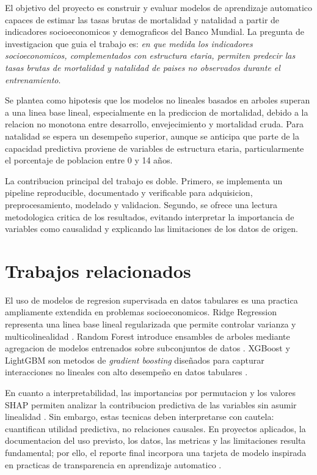 \documentclass[conference]{IEEEtran}
\begin{document}
El objetivo del proyecto es construir y evaluar modelos de aprendizaje automatico capaces de estimar las tasas brutas de mortalidad y natalidad a partir de indicadores socioeconomicos y demograficos del Banco Mundial. La pregunta de investigacion que guia el trabajo es: \textit{en que medida los indicadores socioeconomicos, complementados con estructura etaria, permiten predecir las tasas brutas de mortalidad y natalidad de paises no observados durante el entrenamiento}.

Se plantea como hipotesis que los modelos no lineales basados en arboles superan a una linea base lineal, especialmente en la prediccion de mortalidad, debido a la relacion no monotona entre desarrollo, envejecimiento y mortalidad cruda. Para natalidad se espera un desempeño superior, aunque se anticipa que parte de la capacidad predictiva proviene de variables de estructura etaria, particularmente el porcentaje de poblacion entre 0 y 14 años.

La contribucion principal del trabajo es doble. Primero, se implementa un pipeline reproducible, documentado y verificable para adquisicion, preprocesamiento, modelado y validacion. Segundo, se ofrece una lectura metodologica critica de los resultados, evitando interpretar la importancia de variables como causalidad y explicando las limitaciones de los datos de origen.

\section{Trabajos relacionados}

El uso de modelos de regresion supervisada en datos tabulares es una practica ampliamente extendida en problemas socioeconomicos. Ridge Regression representa una linea base lineal regularizada que permite controlar varianza y multicolinealidad \cite{hoerl1970ridge}. Random Forest introduce ensambles de arboles mediante agregacion de modelos entrenados sobre subconjuntos de datos \cite{breiman2001random}. XGBoost y LightGBM son metodos de \textit{gradient boosting} diseñados para capturar interacciones no lineales con alto desempeño en datos tabulares \cite{chen2016xgboost,ke2017lightgbm}.

En cuanto a interpretabilidad, las importancias por permutacion y los valores SHAP permiten analizar la contribucion predictiva de las variables sin asumir linealidad \cite{lundberg2017shap}. Sin embargo, estas tecnicas deben interpretarse con cautela: cuantifican utilidad predictiva, no relaciones causales. En proyectos aplicados, la documentacion del uso previsto, los datos, las metricas y las limitaciones resulta fundamental; por ello, el reporte final incorpora una tarjeta de modelo inspirada en practicas de transparencia en aprendizaje automatico \cite{mitchell2019modelcards}.
\end{document}
